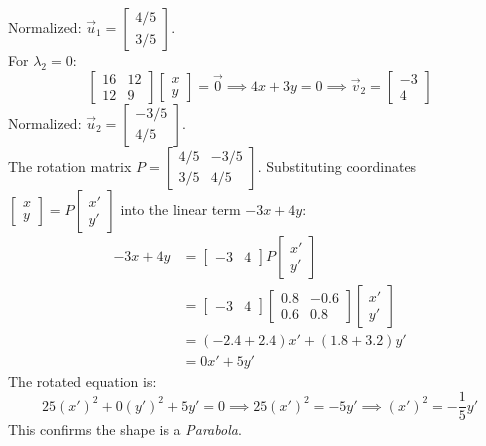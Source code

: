 \documentclass{article}
\begin{document}
Normalized: $\vec{u}_1 =
	\begin{bmatrix}
		4/5 \\
		3/5
	\end{bmatrix}$.
\\
For $\lambda_2 = 0$:
\[
	\begin{bmatrix}
		16 & 12 \\
		12 & 9
	\end{bmatrix}
	\begin{bmatrix}
		x \\
		y
	\end{bmatrix}
	= \vec{0} \implies 4x + 3y = 0 \implies \vec{v}_2
	=
	\begin{bmatrix}
		-3 \\
		4
	\end{bmatrix}
\]
Normalized: $\vec{u}_2 = \begin{bmatrix} -3/5 \\ 4/5 \end{bmatrix}$.
\\
The rotation matrix $P =
	\begin{bmatrix}
		4/5 & -3/5 \\
		3/5 & 4/5
	\end{bmatrix}$.
Substituting coordinates $
	\begin{bmatrix}
		x \\
		y
	\end{bmatrix}
	= P
	\begin{bmatrix}
		x' \\
		y'
	\end{bmatrix}$
into the linear term $-3x + 4y$:
\begin{align*}
	-3x + 4y & =
	\begin{bmatrix}
		-3 & 4
	\end{bmatrix}
	P
	\begin{bmatrix}
		x' \\
		y'
	\end{bmatrix}                              \\
	         & =
	\begin{bmatrix}
		-3 & 4
	\end{bmatrix}
	\begin{bmatrix}
		0.8 & -0.6 \\
		0.6 & 0.8
	\end{bmatrix}
	\begin{bmatrix}
		x' \\
		y'
	\end{bmatrix}                              \\
	         & = (-2.4 + 2.4)x' + (1.8 + 3.2)y' \\
	         & = 0x' + 5y'
\end{align*}
The rotated equation is:
\[
	25(x')^2 + 0(y')^2 + 5y' = 0 \implies 25(x')^2 = -5y' \implies (x')^2 = -\frac{1}{5}y'
\]
This confirms the shape is a \textit{Parabola}.
\end{document}
